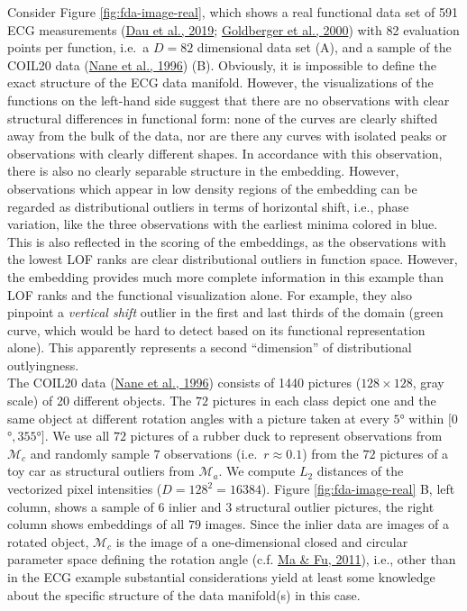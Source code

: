 \documentclass[
  10pt]{article}
\newcommand{\obsdim}{\ensuremath{D}}    %
\newcommand{\co}{c}
\newcommand{\an}{a}
\newcommand{\Min}{\mathcal{M}_{\co}}
\newcommand{\Man}{\mathcal{M}_{\an}}
\begin{document}
Consider Figure \ref{fig:fda-image-real}, which shows a real functional data set of 591 ECG measurements (\protect\hyperlink{ref-dau2019ucr}{Dau et al., 2019}; \protect\hyperlink{ref-goldberger2000physiobank}{Goldberger et al., 2000}) with 82 evaluation points per function, i.e.~a \(\obsdim = 82\) dimensional data set (A), and a sample of the COIL20 data (\protect\hyperlink{ref-coil20}{Nane et al., 1996}) (B). Obviously, it is impossible to define the exact structure of the ECG data manifold. However, the visualizations of the functions on the left-hand side suggest that there are no observations with clear structural differences in functional form: none of the curves are clearly shifted away from the bulk of the data, nor are there any curves with isolated peaks or observations with clearly different shapes. In accordance with this observation, there is also no clearly separable structure in the embedding. However, observations which appear in low density regions of the embedding can be regarded as distributional outliers in terms of horizontal shift, i.e., phase variation, like the three observations with the earliest minima colored in blue.
This is also reflected in the scoring of the embeddings, as the observations with the lowest LOF ranks are clear distributional outliers in function space. However, the embedding provides much more complete information in this example than LOF ranks and the functional visualization alone. For example, they also pinpoint a \textit{vertical shift} outlier in the first and last thirds of the domain (green curve, which would be hard to detect based on its functional representation alone). This apparently represents a second ``dimension'' of distributional outlyingness.\\
The COIL20 data (\protect\hyperlink{ref-coil20}{Nane et al., 1996}) consists of 1440 pictures (\(128 \times 128\), gray scale) of 20 different objects. The \(72\) pictures in each class depict one and the same object at different rotation angles with a picture taken at every \(5\)° within \([0\)°\(, 355\)°\(]\).
We use all \(72\) pictures of a rubber duck to represent observations from \(\Min\) and randomly sample \(7\) observations (i.e.~\(r \approx 0.1\)) from the \(72\) pictures of a toy car as structural outliers from \(\Man\). We compute \(L_2\) distances of the vectorized pixel intensities (\(\obsdim = 128^2 = 16384\)).
Figure \ref{fig:fda-image-real} B, left column, shows a sample of \(6\) inlier and \(3\) structural outlier pictures, the right column shows embeddings of all \(79\) images.
Since the inlier data are images of a rotated object, \(\Min\) is the image of a one-dimensional closed and circular parameter space defining the rotation angle (c.f. \protect\hyperlink{ref-ma2011manifold}{Ma \& Fu, 2011}), i.e., other than in the ECG example substantial considerations yield at least some knowledge about the specific structure of the data manifold(s) in this case.
\end{document}
